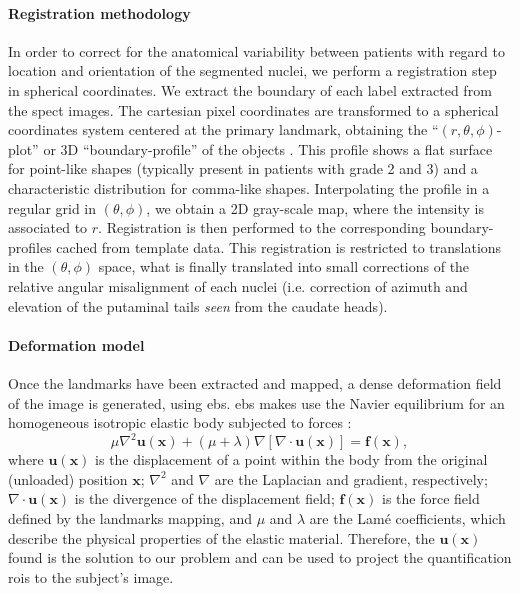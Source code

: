 \documentclass{frontiers}
\newcommand{\cbstart}{\relax}
\newcommand{\cbend}{\relax}
\newcommand{\vect}[1]{\ensuremath{\mathbf{#1}}}
\begin{document}
\paragraph{Registration methodology}
\label{par:registration}
\cbstart
In order to correct for the anatomical variability between patients with regard to location and orientation of the segmented nuclei, we
  perform a registration step in spherical coordinates.
\cbend
We extract the boundary of each label extracted from the \gls*{spect} images. The cartesian pixel coordinates are
  transformed to a spherical coordinates system centered at the primary 
  landmark, obtaining the ``$(r,\theta,\phi)$-plot'' or 3D ``boundary-profile''
  of the objects \citep{davies_computer_2012}.
This profile shows a flat surface for point-like shapes (typically
  present in patients with grade 2 and 3) and a characteristic distribution for
  comma-like shapes. Interpolating the profile in a regular grid in $(\theta,\phi)$, 
  we obtain a 2D gray-scale map, where the intensity is associated to $r$.
Registration is then performed to the corresponding boundary-profiles cached from
  template data. This registration is restricted to translations in the
  $(\theta,\phi)$ space, what is finally translated into small corrections of
  the relative angular misalignment of each nuclei (i.e. correction of
  azimuth and elevation of the putaminal tails \emph{seen} from the caudate heads).

\paragraph{Deformation model}
\label{sec:deformation}
Once the landmarks have been extracted and mapped, a dense deformation field of the image
  is generated, using \gls*{ebs}. \gls*{ebs} makes use the Navier 
  equilibrium  for an homogeneous isotropic elastic body
  subjected to forces \citep{davis_physics-based_1997}:
  \begin{equation}
    \label{eq:ebs_pde}
    \mu \nabla^2 \vect{u}(\vect{x}) + (\mu+\lambda) \nabla \left[ \nabla \cdot \vect{u}(\vect{x}) \right] = \vect{f}(\vect{x}),
  \end{equation}
  where $\vect{u}(\vect{x})$ is the displacement of a point within the body
  from the original (unloaded) position $\vect{x}$; $\nabla^2$ and $\nabla$
  are the Laplacian and gradient, respectively; $\nabla \cdot \vect{u}(\vect{x})$
  is the divergence of the displacement field; $\vect{f}(\vect{x})$ is the force
  field defined by the landmarks mapping, and $\mu$ and $\lambda$ are the Lam\'e
  coefficients, which describe the physical properties of the elastic material.
Therefore, the $\vect{u}(\vect{x})$ found is the solution to our problem and
  can be used to project the quantification \glspl*{roi} to the subject's image.
\end{document}
